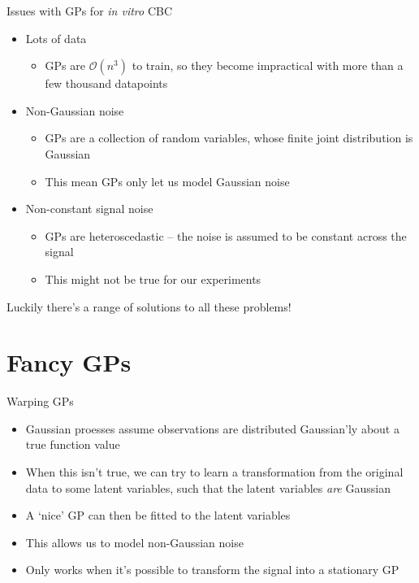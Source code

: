 \documentclass[presentation]{beamer}
\begin{document}
\begin{frame}[label={sec:org949970f}]{Issues with GPs for \emph{in vitro} CBC}
\begin{itemize}
\item Lots of data
\begin{itemize}
\item GPs are \(\mathcal{O}(n^3)\) to train, so they become impractical with more than a few thousand datapoints
\end{itemize}
\item Non-Gaussian noise
\begin{itemize}
\item GPs are a collection of random variables, whose finite joint distribution is Gaussian
\item This mean GPs only let us model Gaussian noise
\end{itemize}
\item Non-constant signal noise
\begin{itemize}
\item GPs are heteroscedastic -- the noise is assumed to be constant across the signal
\item This might not be true for our experiments
\end{itemize}
\end{itemize}

\vfill

Luckily there's a range of solutions to all these problems!
\end{frame}


\section{Fancy GPs}
\label{sec:org8549c92}
\begin{frame}[label={sec:orga7b3dec}]{Warping GPs}
\begin{itemize}
\item Gaussian proesses assume observations are distributed Gaussian'ly about a true function value
\item When this isn't true, we can try to learn a transformation from the original data to some latent variables, such that the latent variables \emph{are} Gaussian
\item A `nice' GP can then be fitted to the latent variables
\item This allows us to model non-Gaussian noise
\item Only works when it's possible to transform the signal into a stationary GP
\end{itemize}
\end{frame}
\end{document}
